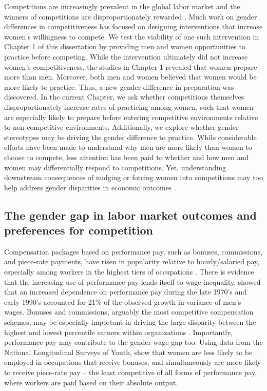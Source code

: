 \documentclass[a4paper, nobind]{templates/ociamthesis}
\begin{document}
Competitions are increasingly prevalent in the global labor market \autocite{Lavy2004,Lemiuex2009} and the winners of competitions are disproportionately rewarded \autocite{Frank2010}. Much work on gender differences in competitiveness has focused on designing interventions that increase women's willingness to compete. We test the viability of one such intervention in Chapter 1 of this dissertation by providing men and women opportunities to practice before competing. While the intervention ultimately did not increase women's competitiveness, the studies in Chapter 1 revealed that women prepare more than men. Moreover, both men and women believed that women would be more likely to practice. Thus, a new gender difference in preparation was discovered. In the current Chapter, we ask whether competitions themselves disproportionately increase rates of practicing among women, such that women are especially likely to prepare before entering competitive environments relative to non-competitive environments. Additionally, we explore whether gender stereotypes may be driving the gender difference to practice. While considerable efforts have been made to understand why men are more likely than women to choose to compete, less attention has been paid to whether and how men and women may differentially respond to competitions. Yet, understanding downstream consequences of nudging or forcing women into competitions may too help address gender disparities in economic outcomes \autocite{Blau2017,Altonji1999}.

\hypertarget{the-gender-gap-in-labor-market-outcomes-and-preferences-for-competition}{%
\subsection{The gender gap in labor market outcomes and preferences for competition}\label{the-gender-gap-in-labor-market-outcomes-and-preferences-for-competition}}

Compensation packages based on performance pay, such as bonuses, commissions, and piece-rate payments, have risen in popularity relative to hourly/salaried pay, especially among workers in the highest tiers of occupations \autocite{Hall1998,Murphy1999,Cunat2005,Lemiuex2009}. There is evidence that the increasing use of performance pay lends itself to wage inequality. \textcite{Lemiuex2009} showed that an increased dependence on performance pay during the late 1970's and early 1990's accounted for 21\% of the observed growth in variance of men's wages. Bonuses and commissions, arguably the most competitive compensation schemes, may be especially important in driving the large disparity between the highest and lowest percentile earners within organizations \autocite{Bell2010,Bell2014,Benabou2016}. Importantly, performance pay may contribute to the gender wage gap too. Using data from the National Longitudinal Surveys of Youth, \textcite{McGee2015} show that women are less likely to be employed in occupations that receive bonuses, and simultaneously are more likely to receive piece-rate pay -- the least competitive of all forms of performance pay, where workers are paid based on their absolute output.
\end{document}
